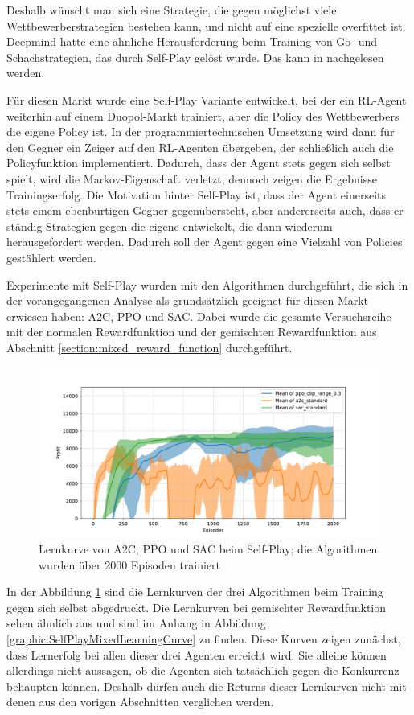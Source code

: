 Deshalb wünscht man sich eine Strategie, die gegen möglichst viele Wettbewerberstrategien bestehen kann, und nicht auf eine spezielle overfittet ist.
Deepmind hatte eine ähnliche Herausforderung beim Training von Go- und Schachstrategien, das durch Self-Play gelöst wurde. 
Das kann in \cite{Silver2017, https://doi.org/10.48550/arxiv.1712.01815} nachgelesen werden.

Für diesen Markt wurde eine Self-Play Variante entwickelt, bei der ein RL-Agent weiterhin auf einem Duopol-Markt trainiert, aber die Policy des Wettbewerbers die eigene Policy ist.
In der programmiertechnischen Umsetzung wird dann für den Gegner ein Zeiger auf den RL-Agenten übergeben, der schließlich auch die Policyfunktion implementiert.
Dadurch, dass der Agent stets gegen sich selbst spielt, wird die Markov-Eigenschaft verletzt, dennoch zeigen die Ergebnisse Trainingserfolg.
Die Motivation hinter Self-Play ist, dass der Agent einerseits stets einem ebenbürtigen Gegner gegenübersteht, aber andererseits auch, dass er ständig Strategien gegen die eigene entwickelt, die dann wiederum herausgefordert werden.
Dadurch soll der Agent gegen eine Vielzahl von Policies gestählert werden.

Experimente mit Self-Play wurden mit den Algorithmen durchgeführt, die sich in der vorangegangenen Analyse als grundsätzlich geeignet für diesen Markt erwiesen haben: A2C, PPO und SAC.
Dabei wurde die gesamte Versuchsreihe mit der normalen Rewardfunktion und der gemischten Rewardfunktion aus Abschnitt \ref{section:mixed_reward_function} durchgeführt.

\begin{figure}[htb]
	\centering
	\includegraphics[width=\textwidth]{main/self_play.pdf}
	\caption{Lernkurve von A2C, PPO und SAC beim Self-Play; die Algorithmen wurden über 2000 Episoden trainiert}
	\label{graphic:SelfPlayLearningCurve}
\end{figure}
In der Abbildung \ref{graphic:SelfPlayLearningCurve} sind die Lernkurven der drei Algorithmen beim Training gegen sich selbst abgedruckt.
Die Lernkurven bei gemischter Rewardfunktion sehen ähnlich aus und sind im Anhang in Abbildung \ref{graphic:SelfPlayMixedLearningCurve} zu finden.
Diese Kurven zeigen zunächst, dass Lernerfolg bei allen dieser drei Agenten erreicht wird.
Sie alleine können allerdings nicht aussagen, ob die Agenten sich tatsächlich gegen die Konkurrenz behaupten können.
Deshalb dürfen auch die Returns dieser Lernkurven nicht mit denen aus den vorigen Abschnitten verglichen werden.

